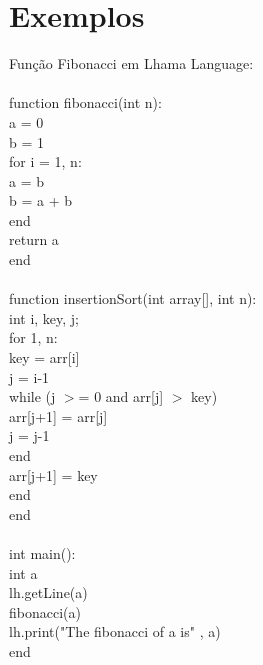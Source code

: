 \documentclass[letterpaper,12pt]{article}
\begin{document}
\section{Exemplos}
Fun\c{c}\~ao Fibonacci em Lhama Language:\\
\\
function fibonacci(int n):\\
\hspace*{8mm}a = 0\\
\hspace*{8mm}b = 1\\
\hspace*{8mm}for i = 1, n:\\
\hspace*{12mm}a = b\\
\hspace*{12mm}b = a + b\\
\hspace*{8mm}end\\
\hspace*{8mm}return a\\
end\\
\\
function insertionSort(int array[], int n):\\
\hspace*{8mm}int i, key, j;\\
\hspace*{8mm}for 1, n:\\
\hspace*{12mm}key = arr[i]\\
\hspace*{12mm}j = i-1\\
\hspace*{12mm}while (j $>$= 0 and arr[j] $>$ key)\\
\hspace*{16mm}arr[j+1] = arr[j]\\
\hspace*{16mm}j = j-1\\
\hspace*{12mm}end\\
\hspace*{12mm}arr[j+1] = key\\
\hspace*{8mm}end\\
end\\
\\
int main():\\
\hspace*{8mm}int a\\
\hspace*{8mm}lh.getLine(a)\\
\hspace*{8mm}fibonacci(a)\\
\hspace*{8mm}lh.print("The fibonacci of a is" , a)\\
end\\
\end{document}
